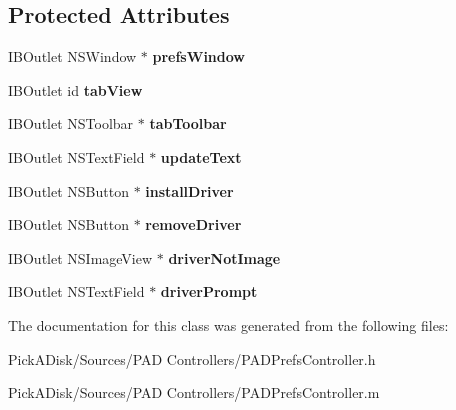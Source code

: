 \subsection*{Protected Attributes}
\begin{DoxyCompactItemize}
\item 
\hypertarget{interface_p_a_d_prefs_controller_a951d7de55fe486ed9c48cdb182f33519}{
IBOutlet NSWindow $\ast$ {\bfseries prefsWindow}}
\label{interface_p_a_d_prefs_controller_a951d7de55fe486ed9c48cdb182f33519}

\item 
\hypertarget{interface_p_a_d_prefs_controller_a609796ae6d8e1bceeabe6df7a92fa859}{
IBOutlet id {\bfseries tabView}}
\label{interface_p_a_d_prefs_controller_a609796ae6d8e1bceeabe6df7a92fa859}

\item 
\hypertarget{interface_p_a_d_prefs_controller_a91a4a57427a4687cd0c8563d85cbaff8}{
IBOutlet NSToolbar $\ast$ {\bfseries tabToolbar}}
\label{interface_p_a_d_prefs_controller_a91a4a57427a4687cd0c8563d85cbaff8}

\item 
\hypertarget{interface_p_a_d_prefs_controller_abe9b0dfc1d1e30aebfc901d8ec436a31}{
IBOutlet NSTextField $\ast$ {\bfseries updateText}}
\label{interface_p_a_d_prefs_controller_abe9b0dfc1d1e30aebfc901d8ec436a31}

\item 
\hypertarget{interface_p_a_d_prefs_controller_abb6b7d7b64b526455313cba4800ba097}{
IBOutlet NSButton $\ast$ {\bfseries installDriver}}
\label{interface_p_a_d_prefs_controller_abb6b7d7b64b526455313cba4800ba097}

\item 
\hypertarget{interface_p_a_d_prefs_controller_ac84da10c949b9cb9de585f52b2c1fd43}{
IBOutlet NSButton $\ast$ {\bfseries removeDriver}}
\label{interface_p_a_d_prefs_controller_ac84da10c949b9cb9de585f52b2c1fd43}

\item 
\hypertarget{interface_p_a_d_prefs_controller_ac351d6a3d22e433de1de566bded37284}{
IBOutlet NSImageView $\ast$ {\bfseries driverNotImage}}
\label{interface_p_a_d_prefs_controller_ac351d6a3d22e433de1de566bded37284}

\item 
\hypertarget{interface_p_a_d_prefs_controller_ab95805d5f8f02a399d7c60ba33aeb945}{
IBOutlet NSTextField $\ast$ {\bfseries driverPrompt}}
\label{interface_p_a_d_prefs_controller_ab95805d5f8f02a399d7c60ba33aeb945}

\end{DoxyCompactItemize}


The documentation for this class was generated from the following files:\begin{DoxyCompactItemize}
\item 
PickADisk/Sources/PAD Controllers/PADPrefsController.h\item 
PickADisk/Sources/PAD Controllers/PADPrefsController.m\end{DoxyCompactItemize}
